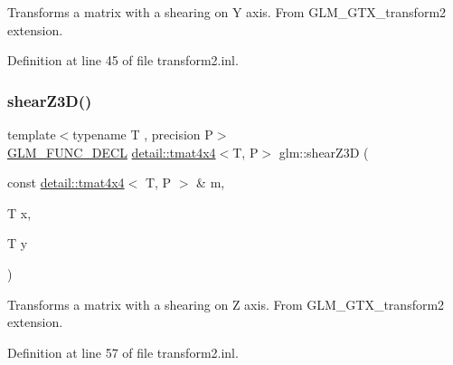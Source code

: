 Transforms a matrix with a shearing on Y axis. From G\+L\+M\+\_\+\+G\+T\+X\+\_\+transform2 extension. 

Definition at line 45 of file transform2.\+inl.

\mbox{\label{group__gtx__transform2_ga02fa747667daf42b64ea344d1076acee}} 
\subsubsection{\texorpdfstring{shear\+Z3\+D()}{shearZ3D()}}
{\footnotesize\ttfamily template$<$typename T , precision P$>$ \\
\hyperlink{setup_8hpp_ab2d052de21a70539923e9bcbf6e83a51}{G\+L\+M\+\_\+\+F\+U\+N\+C\+\_\+\+D\+E\+CL} \hyperlink{structglm_1_1detail_1_1tmat4x4}{detail\+::tmat4x4}$<$T, P$>$ glm\+::shear\+Z3D (\begin{DoxyParamCaption}\item[{const \hyperlink{structglm_1_1detail_1_1tmat4x4}{detail\+::tmat4x4}$<$ T, P $>$ \&}]{m,  }\item[{T}]{x,  }\item[{T}]{y }\end{DoxyParamCaption})}

Transforms a matrix with a shearing on Z axis. From G\+L\+M\+\_\+\+G\+T\+X\+\_\+transform2 extension. 

Definition at line 57 of file transform2.\+inl.

